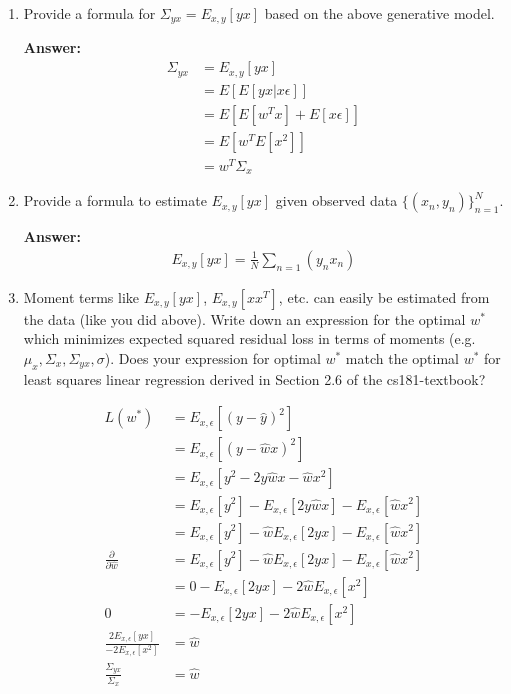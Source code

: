 \documentclass[submit]{harvardml}
\begin{document}
\begin{enumerate}

\item Provide a formula for $\Sigma_{yx} = E_{x, y}[yx]$ based on the above generative model.

\textbf{Answer:}
\begin{equation}
  \begin{split}
    \Sigma_{yx} &= E_{x, y}[yx]\\
    &= E[E[yx|x \epsilon]] \\
    &= E[E[w^Tx] + E[x \epsilon]] \\
    &= E[w^TE[x^2]] \\
    &= w^T\Sigma_x
    \end{split}
\end{equation}


\item Provide a formula to estimate $E_{x, y}[yx]$ given observed data $\{(x_n,y_n)\}_{n=1}^N$.

\textbf{Answer:}
\begin{equation}
  \begin{split}
  E_{x, y}[yx] = \frac{1}{N}\sum_{n=1}(y_n x_n)
  \end{split}
\end{equation}

\item Moment terms like $E_{x, y}[yx]$, $E_{x, y}[xx^T]$, etc. can easily be
  estimated from the data (like you did above).  Write down an
  expression for the optimal $w^*$ which minimizes expected squared residual loss 
  in terms of moments
  (e.g. $\mu_x,\Sigma_x,\Sigma_{yx},\sigma$). Does your expression for optimal $w^*$ match the optimal $w^*$ for least squares linear regression derived in Section 2.6 of the cs181-textbook?
  
\begin{equation}
    \begin{split}
        L(w^*) &= E_{x, \epsilon} [(y - \hat{y})^2] \\
        &= E_{x, \epsilon} [(y - \hat{w} x)^2] \\
        &= E_{x, \epsilon}[y^2 - 2y\hat{w}x - \hat{w}x^2]\\
        &= E_{x, \epsilon}[y^2] - E_{x, \epsilon}[2y\hat{w}x] -E_{x, \epsilon}[\hat{w}x^2]\\
        &= E_{x, \epsilon}[y^2] - \hat{w} E_{x, \epsilon}[2yx] -E_{x, \epsilon}[\hat{w}x^2]\\
        \frac{\partial}{\partial \hat{w}}&= E_{x, \epsilon}[y^2] - \hat{w} E_{x, \epsilon}[2yx] -E_{x, \epsilon}[\hat{w}x^2] \\
        &= 0 - E_{x, \epsilon}[2yx] - 2\hat{w} E_{x, \epsilon}[x^2]\\
        0 &= - E_{x, \epsilon}[2yx] - 2\hat{w} E_{x, \epsilon}[x^2]\\
        \frac{2E_{x,\epsilon}[yx]}{-2E_{x,\epsilon}[x^2]} &= \hat{w}\\
        \frac{\Sigma_{yx}}{\Sigma_{x}} &= \hat{w}\\
    \end{split}
\end{equation}


\end{enumerate}
\end{document}
